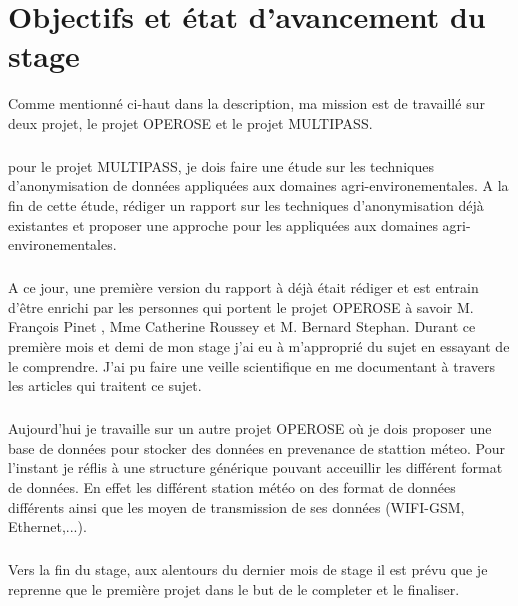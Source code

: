 \chapter{Objectifs et état d'avancement du stage}
Comme mentionné ci-haut dans la description, ma mission est de travaillé sur deux projet, le projet OPEROSE et le projet MULTIPASS. 

\paragraph{}
pour le projet MULTIPASS, je dois faire une étude sur les techniques d'anonymisation de données appliquées aux domaines agri-environementales. A la fin de cette étude, rédiger un rapport sur les techniques d'anonymisation déjà existantes et proposer une approche pour les appliquées aux domaines agri-environementales.
\paragraph{}
A ce jour, une première version du rapport à déjà était rédiger et est entrain d'être enrichi par les personnes qui portent le projet OPEROSE à savoir M. François Pinet , Mme Catherine Roussey  et M. Bernard Stephan. Durant ce première mois et demi de mon stage j'ai eu à m'approprié du sujet en essayant de le comprendre. J'ai pu faire une veille scientifique en me documentant à travers les articles qui traitent ce sujet. 

\paragraph{}
Aujourd'hui je travaille sur un autre projet OPEROSE où je dois proposer une base de données pour stocker des données en prevenance de stattion méteo. Pour l'instant je réflis à une structure générique pouvant acceuillir les différent format de données. En effet les différent station météo on des format de données différents ainsi que les moyen de transmission de ses données (WIFI-GSM, Ethernet,...).


\paragraph{}
Vers la fin du stage, aux alentours du dernier mois de stage il est prévu que je reprenne que le première projet dans le but de le completer et le finaliser.

